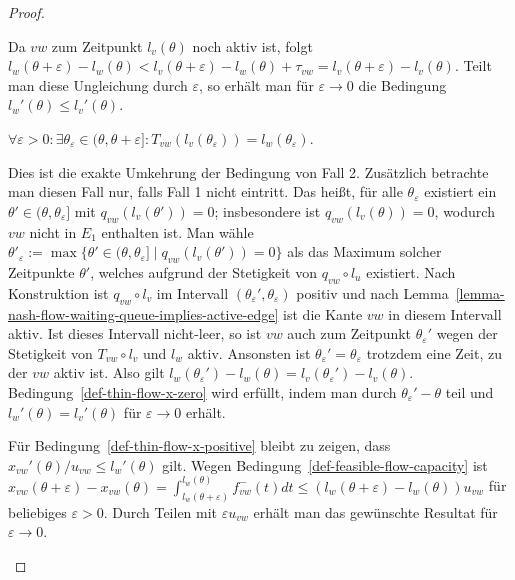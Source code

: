 \begin{proof}
\begin{description}[leftmargin=0cm, topsep=0cm, itemindent=0.5cm]
		Da $vw$ zum Zeitpunkt $l_v(\theta)$ noch aktiv ist, folgt $l_w(\theta + \varepsilon) - l_w(\theta) < l_v(\theta+\varepsilon) - l_w(\theta) + \tau_{vw} = l_v(\theta + \varepsilon) - l_v(\theta)$.
		Teilt man diese Ungleichung  durch $\varepsilon$, so erhält man für $\varepsilon\rightarrow 0$ die Bedingung $l_w'(\theta)\leq l_v'(\theta)$.
		
		\item[3. Fall:] $\forall \varepsilon>0: \exists \theta_{\varepsilon}\in (\theta, \theta+\varepsilon]: T_{vw}(l_v(\theta_\varepsilon)) = l_w(\theta_\varepsilon)$.
		
		Dies ist die exakte Umkehrung der Bedingung von Fall 2.
		Zusätzlich betrachte man diesen Fall nur, falls Fall 1 nicht eintritt.
		Das heißt, für alle $\theta_\varepsilon$ existiert ein $\theta'\in(\theta, \theta_\varepsilon]$ mit $q_{vw}(l_v(\theta')) = 0$; insbesondere ist $q_{vw}(l_v(\theta))= 0$, wodurch $vw$ nicht in $E_1$ enthalten ist.
		Man wähle $\theta'_\varepsilon:=\max\{ \theta'\in (\theta, \theta_\varepsilon] \mid q_{vw}(l_v(\theta')) = 0 \}$ als das Maximum solcher Zeitpunkte $\theta'$, welches aufgrund der Stetigkeit von $q_{vw}\circ l_u$ existiert.
		Nach Konstruktion ist $q_{vw}\circ l_v$ im Intervall $(\theta_\varepsilon', \theta_\varepsilon)$ positiv und nach Lemma~\ref{lemma-nash-flow-waiting-queue-implies-active-edge} ist die Kante $vw$ in diesem Intervall aktiv.
		Ist dieses Intervall nicht-leer, so ist $vw$ auch zum Zeitpunkt $\theta_\varepsilon'$ wegen der Stetigkeit von $T_{vw}\circ l_v$ und $l_w$ aktiv.
		Ansonsten ist $\theta_\varepsilon'=\theta_\varepsilon$ trotzdem eine Zeit, zu der $vw$ aktiv ist.
		Also gilt $l_w(\theta_\varepsilon') - l_w(\theta) = l_v(\theta_\varepsilon') - l_v(\theta)$.
		Bedingung~\ref{def-thin-flow-x-zero} wird erfüllt, indem man durch $\theta_\varepsilon'-\theta$ teil und $l_w'(\theta) = l_v'(\theta)$ für $\varepsilon\rightarrow0$ erhält.
		
		Für Bedingung~\ref{def-thin-flow-x-positive} bleibt zu zeigen, dass $x_{vw}'(\theta) /u_{vw}\leq l_w'(\theta)$ gilt.
		Wegen Bedingung~\ref{def-feasible-flow-capacity} ist $x_{vw}(\theta + \varepsilon)-x_{vw}(\theta) = \int_{l_w(\theta+\varepsilon)}^{l_w(\theta)} f_{vw}^-(t) dt\leq (l_w(\theta + \varepsilon) - l_w(\theta)) u_{vw}$ für beliebiges $\varepsilon>0$.
		Durch Teilen mit $\varepsilon u_{vw}$ erhält man das gewünschte Resultat für $\varepsilon\rightarrow 0$.
		

\end{description}
\end{proof}
